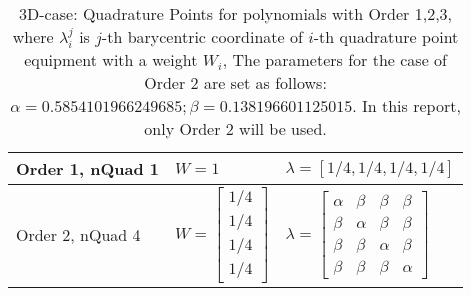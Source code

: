 \begin{table}[ht]
  \centering
  \caption{3D-case: Quadrature Points for polynomials with Order 1,2,3,
  where $\lambda_i^j$ is $j$-th barycentric coordinate of $i$-th quadrature point equipment with a weight $W_i$,
  The parameters for the case of Order 2 are set as follows:$\alpha = 0.5854101966249685; \beta = 0.138196601125015 $.
  In this report, only Order 2 will be used.}
  \label{tab:quadrature-points-3d}
  \begin{tabular}{l|l|l}
    \hline
    Order 1, nQuad 1
    & $W = 1$
    & $\lambda = [1/4, 1/4, 1/4, 1/4]$ \\
    \hline
    Order 2, nQuad 4
    & $W=\left[
      \begin{array}{c}
        1/4 \\
        1/4 \\
        1/4 \\ 
        1/4
      \end{array}\right]$
    &$\lambda=\left[\begin{array}{cccc}
       \alpha & \beta  & \beta  & \beta \\
       \beta  & \alpha & \beta  & \beta \\
       \beta  & \beta  & \alpha & \beta \\
       \beta  & \beta  & \beta  & \alpha 
     \end{array}\right]$ \\
     \hline
  \end{tabular}
\end{table}

